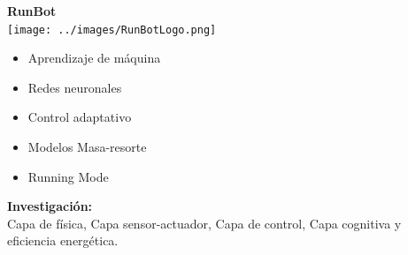 {\begin{frame}
\begin{columns}[T]
\begin{column}{5.0cm}
{\begin{center}
            \textbf{RunBot}\\
            \texttt{[image: ../images/RunBotLogo.png]}\\
            \begin{itemize}
            \item Aprendizaje de m\'aquina
            \item Redes neuronales
            \item Control adaptativo
            \item Modelos Masa-resorte
            \item Running Mode
            \end{itemize}
            \textbf{Investigaci\'on:}\\
            Capa de f\'isica, Capa sensor-actuador, Capa de control, Capa cognitiva y eficiencia energ\'etica.
          \end{center}
        }
\end{column}
\end{columns}
\end{frame}}
